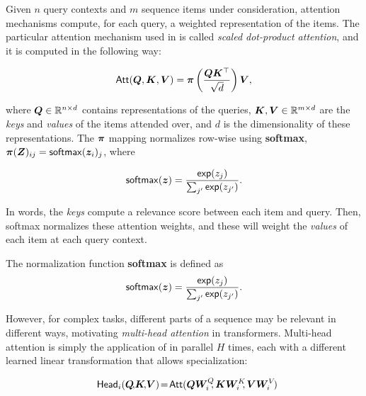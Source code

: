 Given $n$ query contexts and $m$ sequence items under consideration,
attention mechanisms compute, for each query, a weighted
representation of the items. The particular attention mechanism used
in \citet{vaswani2017attention} is called \emph{scaled dot-product
  attention}, and it is computed in the following way:

\begin{equation}
  \operatorname{\mathsf{Att}}(\bm{Q}, \bm{K}, \bm{V}) = \bm{\pi}
  \left(\frac{\bm{Q}\bm{K}^\top}{\sqrt{d}}\right) \bm{V},
  \label{eq:att_scaled_dot}
\end{equation}

\noindent where $\bm{Q} \in \mathbb{R}^{n \times d}$ contains
representations of the queries, $\bm{K}, \bm{V} \in \mathbb{R}^{m \times
    d}$ are the \emph{keys} and \emph{values} of the items attended over,
and $d$ is the dimensionality of these representations. The $\bm{\pi}$
mapping normalizes row-wise using \textbf{softmax},
$\bm{\pi}(\bm{Z})_{ij} = \operatorname*{\mathsf{softmax}}(\bm{z}_i)_j$, where

\begin{equation}
  \operatorname*{\mathsf{softmax}}(\bm{z}) = \frac{\operatorname*{\mathsf{exp}}(z_j)}{\sum_{j'} \operatorname*{\mathsf{exp}}(z_{j'})}.
\end{equation}

In words, the \emph{keys} compute a relevance score between each item
and query. Then, softmax normalizes these attention weights, and
these will weight the \emph{values} of each item at each query
context.

\begin{definition}
  The normalization function \textbf{softmax} is defined as
  \begin{equation}\label{eq:softmax}
    \operatorname*{\mathsf{softmax}}(\bm{z}) = \frac{\operatorname*{\mathsf{exp}}(z_j)}{\sum_{j'} \operatorname*{\mathsf{exp}}(z_{j'})}.
  \end{equation}
\end{definition}

However, for complex tasks, different parts of a sequence may be
relevant in different ways, motivating \emph{multi-head attention} in
transformers. Multi-head attention is simply the application of
 in parallel $H$ times, each with a
different learned linear transformation that allows specialization:

\begin{equation}\label{eq:head}%
  \hspace{-.01ex}%
  \ath_i(\bm{Q}\!,\!\bm{K}\!,\!\bm{V})\!=\!\att(\bm{QW}_i^Q\!\!,\bm{KW}_i^K\!\!,\bm{VW}_i^V\!)%
  \hspace{-1.5ex}%
\end{equation}

